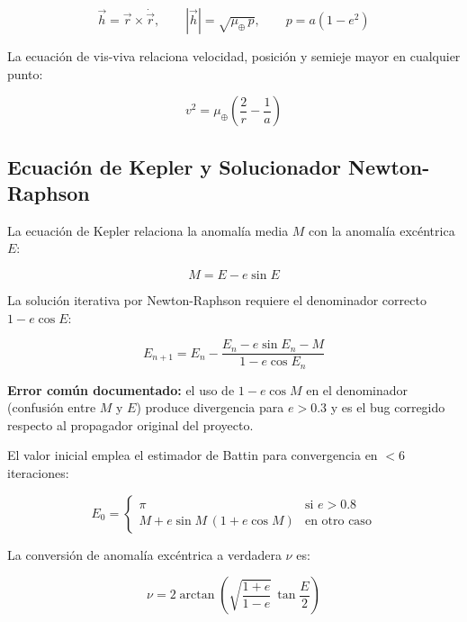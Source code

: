 \documentclass[12pt,a4paper]{article}
\newcommand{\muE}{\mu_{\oplus}}
\begin{document}
\begin{equation}
  \vec{h} = \vec{r} \times \dot{\vec{r}}, \qquad
  |\vec{h}| = \sqrt{\muE\,p}, \qquad p = a(1-e^2)
\end{equation}

La ecuaci\'on de vis-viva relaciona velocidad, posici\'on y semieje mayor en cualquier punto:

\begin{equation}
  v^2 = \muE\!\left(\frac{2}{r} - \frac{1}{a}\right)
\end{equation}

\subsection{Ecuaci\'on de Kepler y Solucionador Newton-Raphson}

La ecuaci\'on de Kepler relaciona la anomal\'ia media $M$ con la anomal\'ia exc\'entrica $E$:

\begin{equation}
  M = E - e\sin E
\end{equation}

La soluci\'on iterativa por Newton-Raphson requiere el denominador correcto $1 - e\cos E$:

\begin{equation}
  E_{n+1} = E_n - \frac{E_n - e\sin E_n - M}{1 - e\cos E_n}
  \label{eq:kepler_nr}
\end{equation}

\textbf{Error com\'un documentado:} el uso de $1 - e\cos M$ en el denominador (confusi\'on entre $M$ y $E$) produce divergencia para $e > 0.3$ y es el bug corregido respecto al propagador original del proyecto.

El valor inicial emplea el estimador de Battin para convergencia en $< 6$ iteraciones:

\begin{equation}
  E_0 = \begin{cases} \pi & \text{si } e > 0.8 \\
  M + e\sin M\,(1 + e\cos M) & \text{en otro caso} \end{cases}
\end{equation}

La conversi\'on de anomal\'ia exc\'entrica a verdadera $\nu$ es:

\begin{equation}
  \nu = 2\arctan\!\left(\sqrt{\frac{1+e}{1-e}}\,\tan\frac{E}{2}\right)
\end{equation}
\end{document}

